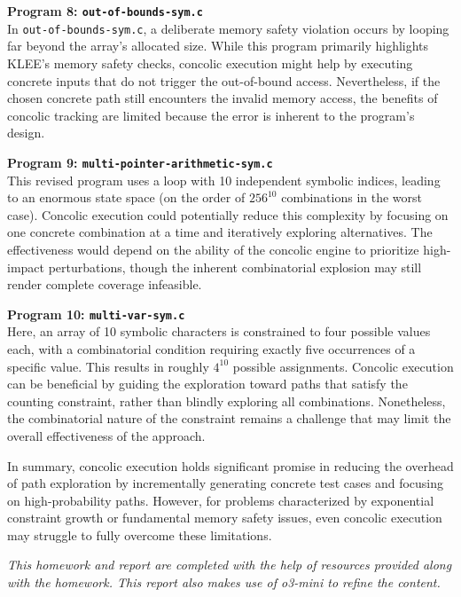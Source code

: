 \documentclass[conference]{IEEEtran}
\begin{document}
\textbf{Program 8: \texttt{out-of-bounds-sym.c}}\\
In \texttt{out-of-bounds-sym.c}, a deliberate memory safety violation occurs by looping far beyond the array's allocated size. While this program primarily highlights KLEE’s memory safety checks, concolic execution might help by executing concrete inputs that do not trigger the out-of-bound access. Nevertheless, if the chosen concrete path still encounters the invalid memory access, the benefits of concolic tracking are limited because the error is inherent to the program's design.


\textbf{Program 9: \texttt{multi-pointer-arithmetic-sym.c}}\\
This revised program uses a loop with 10 independent symbolic indices, leading to an enormous state space (on the order of $256^{10}$ combinations in the worst case). Concolic execution could potentially reduce this complexity by focusing on one concrete combination at a time and iteratively exploring alternatives. The effectiveness would depend on the ability of the concolic engine to prioritize high-impact perturbations, though the inherent combinatorial explosion may still render complete coverage infeasible.


\textbf{Program 10: \texttt{multi-var-sym.c}}\\
Here, an array of 10 symbolic characters is constrained to four possible values each, with a combinatorial condition requiring exactly five occurrences of a specific value. This results in roughly $4^{10}$ possible assignments. Concolic execution can be beneficial by guiding the exploration toward paths that satisfy the counting constraint, rather than blindly exploring all combinations. Nonetheless, the combinatorial nature of the constraint remains a challenge that may limit the overall effectiveness of the approach.

\medskip
In summary, concolic execution holds significant promise in reducing the overhead of path exploration by incrementally generating concrete test cases and focusing on high-probability paths. However, for problems characterized by exponential constraint growth or fundamental memory safety issues, even concolic execution may struggle to fully overcome these limitations.


\textit{This homework and report are completed with the help of resources provided along with the homework. This report also makes use of o3-mini to refine the content.}
\end{document}
